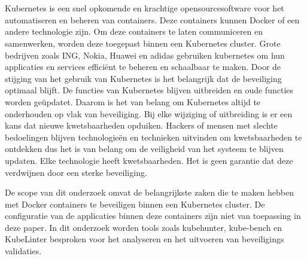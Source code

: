 
\chapter{}%
\label{ch:inleiding}

Kubernetes is een snel opkomende en krachtige opensourcesoftware voor het automatiseren en beheren van containers. Deze containers kunnen Docker of een andere technologie zijn. Om deze containers te laten communiceren en samenwerken, worden deze toegepast binnen een Kubernetes cluster. \autocite{KubernetesDocs-2023} Grote bedrijven zoals ING, Nokia, Huawei en adidas gebruiken kubernetes om hun applicaties en services efficiënt te beheren en schaalbaar te maken. Door de stijging van het gebruik van Kubernetes is het belangrijk dat de beveiliging optimaal blijft. De functies van Kubernetes blijven uitbreiden en oude functies worden geüpdatet. Daarom is het van belang om Kubernetes altijd te onderhouden op vlak van beveiliging. Bij elke wijziging of uitbreiding is er een kans dat nieuwe kwetsbaarheden opduiken. Hackers of mensen met slechte bedoelingen blijven technologieën en technieken uitvinden om kwetsbaarheden te ontdekken dus het is van belang om de veiligheid van het systeem te blijven updaten. Elke technologie heeft kwetsbaarheden. Het is geen garantie dat deze verdwijnen door een sterke beveiliging.

De scope van dit onderzoek omvat de belangrijkste zaken die te maken hebben met Docker containers te beveiligen binnen een Kubernetes cluster. De configuratie van de applicaties binnen deze containers zijn niet van toepassing in deze paper. In dit onderzoek worden tools zoals kubehunter, kube-bench en KubeLinter besproken voor het analyseren en het uitvoeren van beveiligings validaties. 



